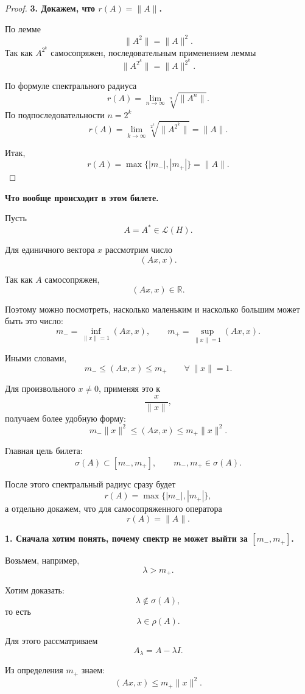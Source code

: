 \begin{proof}
	\textbf{3. Докажем, что \(r(A)=\|A\|\).}
	
	По лемме
	\[
	\|A^2\|=\|A\|^2.
	\]
	Так как \(A^{2^k}\) самосопряжен, последовательным применением леммы
	\[
	\|A^{2^k}\|=\|A\|^{2^k}.
	\]
	
	По формуле спектрального радиуса
	\[
	r(A)
	=
	\lim_{n\to\infty}\sqrt[n]{\|A^n\|}.
	\]
	По подпоследовательности \(n=2^k\)
	\[
	r(A)
	=
	\lim_{k\to\infty}
	\sqrt[2^k]{\|A^{2^k}\|}
	=
	\|A\|.
	\]
	
	Итак,
	\[
	\boxed{
		r(A)=\max\{|m_-|,|m_+|\}=\|A\|.
	}
	\]
	
\end{proof}

\begin{idea}
	\textbf{Что вообще происходит в этом билете.}
	
	Пусть
	\[
	A=A^*\in\mathcal L(H).
	\]
	
	Для единичного вектора \(x\) рассмотрим число
	\[
	(Ax,x).
	\]
	
	Так как \(A\) самосопряжен,
	\[
	(Ax,x)\in\mathbb R.
	\]
	
	Поэтому можно посмотреть, насколько маленьким и насколько большим
	может быть это число:
	\[
	m_-=\inf_{\|x\|=1}(Ax,x),
	\qquad
	m_+=\sup_{\|x\|=1}(Ax,x).
	\]
	
	Иными словами,
	\[
	\boxed{
		m_-\leq (Ax,x)\leq m_+
		\qquad
		\forall\,\|x\|=1.
	}
	\]
	
	Для произвольного \(x\neq0\), применяя это к
	\[
	\frac{x}{\|x\|},
	\]
	получаем более удобную форму:
	\[
	\boxed{
		m_-\|x\|^2
		\leq
		(Ax,x)
		\leq
		m_+\|x\|^2.
	}
	\]
	
	Главная цель билета:
	\[
	\boxed{
		\sigma(A)\subset[m_-,m_+],
		\qquad
		m_-,m_+\in\sigma(A).
	}
	\]
	
	После этого спектральный радиус сразу будет
	\[
	r(A)=\max\{|m_-|,|m_+|\},
	\]
	а отдельно докажем, что для самосопряженного оператора
	\[
	r(A)=\|A\|.
	\]
	
	\medskip
	
	\textbf{1. Сначала хотим понять, почему спектр не может выйти за
		\([m_-,m_+]\).}
	
	Возьмем, например,
	\[
	\lambda>m_+.
	\]
	
	Хотим доказать:
	\[
	\lambda\notin\sigma(A),
	\]
	то есть
	\[
	\lambda\in\rho(A).
	\]
	
	Для этого рассматриваем
	\[
	A_\lambda=A-\lambda I.
	\]
	
	Из определения \(m_+\) знаем:
	\[
	(Ax,x)\leq m_+\|x\|^2.
	\]
	

\end{idea}

